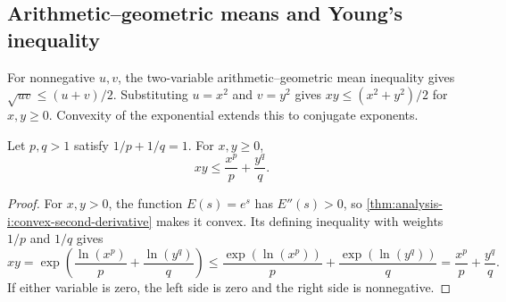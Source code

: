 \subsection{Arithmetic--geometric means and Young's inequality}
For nonnegative $u,v$, the two-variable arithmetic--geometric mean
inequality gives $\sqrt{uv}\le(u+v)/2$. Substituting $u=x^2$ and
$v=y^2$ gives $xy\le(x^2+y^2)/2$ for $x,y\ge0$.
Convexity of the exponential extends this to conjugate exponents.
\begin{proposition}
  \label{thm:analysis-i:young-inequality}
  Let $p,q>1$ satisfy $1/p+1/q=1$. For $x,y\ge0$,
  \[
    xy\le\frac{x^p}{p}+\frac{y^q}{q}.
  \]
\end{proposition}
\begin{proof}
  For $x,y>0$, the function $E(s)=e^s$ has $E''(s)>0$, so
  \autoref{thm:analysis-i:convex-second-derivative} makes it convex.
  Its defining inequality with weights $1/p$ and $1/q$ gives
  \[
    xy=\exp\!\left(\frac{\ln(x^p)}p+\frac{\ln(y^q)}q\right)
      \le\frac{\exp(\ln(x^p))}{p}
        +\frac{\exp(\ln(y^q))}{q}
      =\frac{x^p}{p}+\frac{y^q}{q}.
  \]
  If either variable is zero, the left side is zero and the right
  side is nonnegative.
\end{proof}

